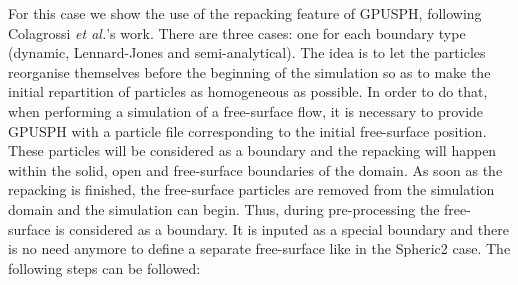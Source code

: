 \documentclass{../GPUSPHtemplate}
\begin{document}
For this case we show the use of the repacking feature of GPUSPH, following Colagrossi \textit{et al.}'s work.
There are three cases: one for each boundary type (dynamic, Lennard-Jones and semi-analytical).
The idea is to let the particles reorganise themselves before the beginning of the simulation so as to
make the initial repartition of particles as homogeneous as possible. In order to do that, when performing a simulation
of a free-surface flow, it is necessary to provide GPUSPH with a particle file corresponding to the initial free-surface
position. These particles will be considered as a boundary and the repacking will happen within the solid, open and free-surface
boundaries of the domain. As soon as the repacking is finished, the free-surface particles are removed from the simulation
domain and the simulation can begin. Thus, during pre-processing the free-surface is considered as a boundary.
It is inputed as a special boundary and there is no need anymore to define a separate free-surface like in the Spheric2 case.
The following steps can be followed:
\end{document}
